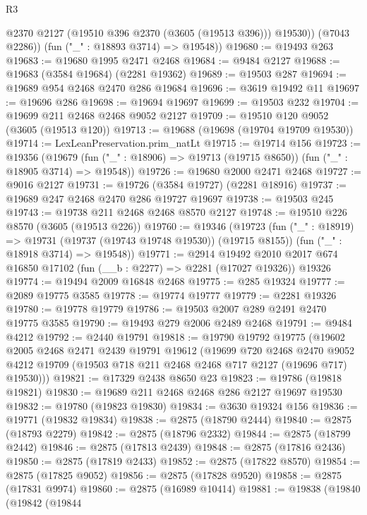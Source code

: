 \begin{lexlean}{R3}
\begin{coremodule}
            @2370
            @2127
            (@19510 @396 @2370 (@3605 (@19513 @396)))
            @19530))
        (@7043 @2286))
      (fun ("_" : @18893 @3714) => @19548))
@19680 := @19493 @263
@19683 := @19680 @1995 @2471 @2468
@19684 := @9484 @2127
@19688 := @19683 (@3584 @19684) (@2281 @19362)
@19689 := @19503 @287
@19694 := @19689 @954 @2468 @2470 @286 @19684
@19696 := @3619 @19492 @11
@19697 := @19696 @286
@19698 := @19694 @19697
@19699 := @19503 @232
@19704 := @19699 @211 @2468 @2468 @9052 @2127
@19709 := @19510 @120 @9052 (@3605 (@19513 @120))
@19713 := @19688 (@19698 (@19704 @19709 @19530))
@19714 := LexLeanPreservation.prim_natLt
@19715 := @19714 @156
@19723 := @19356
    (@19679 (fun ("_" : @18906) => @19713 (@19715 @8650)) (fun ("_" : @18905 @3714) => @19548))
@19726 := @19680 @2000 @2471 @2468
@19727 := @9016 @2127
@19731 := @19726 (@3584 @19727) (@2281 @18916)
@19737 := @19689 @247 @2468 @2470 @286 @19727 @19697
@19738 := @19503 @245
@19743 := @19738 @211 @2468 @2468 @8570 @2127
@19748 := @19510 @226 @8570 (@3605 (@19513 @226))
@19760 := @19346
    (@19723
      (fun ("_" : @18919) => @19731 (@19737 (@19743 @19748 @19530)) (@19715 @8155))
      (fun ("_" : @18918 @3714) => @19548))
@19771 := @2914
    @19492
    @2010
    @2017
    @674
    @16850
    @17102
    (fun (__b : @2277) => @2281 (@17027 @19326))
    @19326
@19774 := @19494 @2009 @16848 @2468
@19775 := @285 @19324
@19777 := @2089 @19775 @3585
@19778 := @19774 @19777
@19779 := @2281 @19326
@19780 := @19778 @19779
@19786 := @19503 @2007 @289 @2491 @2470 @19775 @3585
@19790 := @19493 @279 @2006 @2489 @2468
@19791 := @9484 @4212
@19792 := @2440 @19791
@19818 := @19790
    @19792
    @19775
    (@19602
      @2005
      @2468
      @2471
      @2439
      @19791
      @19612
      (@19699
        @720
        @2468
        @2470
        @9052
        @4212
        @19709
        (@19503 @718 @211 @2468 @2468 @717 @2127 (@19696 @717) @19530)))
@19821 := @17329 @2438 @8650 @23
@19823 := @19786 (@19818 @19821)
@19830 := @19689 @211 @2468 @2468 @286 @2127 @19697 @19530
@19832 := @19780 (@19823 @19830)
@19834 := @3630 @19324 @156
@19836 := @19771 (@19832 @19834)
@19838 := @2875 (@18790 @2444)
@19840 := @2875 (@18793 @2279)
@19842 := @2875 (@18796 @2332)
@19844 := @2875 (@18799 @2442)
@19846 := @2875 (@17813 @2439)
@19848 := @2875 (@17816 @2436)
@19850 := @2875 (@17819 @2433)
@19852 := @2875 (@17822 @8570)
@19854 := @2875 (@17825 @9052)
@19856 := @2875 (@17828 @9520)
@19858 := @2875 (@17831 @9974)
@19860 := @2875 (@16989 @10414)
@19881 := @19838
    (@19840
      (@19842
        (@19844

\end{coremodule}
\end{lexlean}
